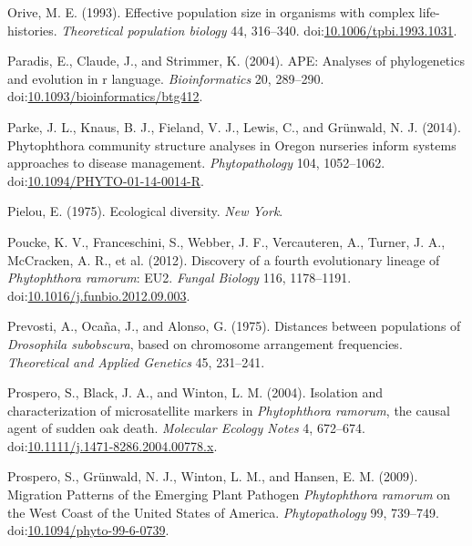 \documentclass[double,12pt]{beavtex}
\begin{document}
  \hypertarget{ref-orive1993effective}{}
  Orive, M. E. (1993). Effective population size in organisms with complex
  life-histories. \emph{Theoretical population biology} 44, 316--340.
  doi:\href{https://doi.org/10.1006/tpbi.1993.1031}{10.1006/tpbi.1993.1031}.
  
  \hypertarget{ref-paradis2004ape}{}
  Paradis, E., Claude, J., and Strimmer, K. (2004). APE: Analyses of
  phylogenetics and evolution in r language. \emph{Bioinformatics} 20,
  289--290.
  doi:\href{https://doi.org/10.1093/bioinformatics/btg412}{10.1093/bioinformatics/btg412}.
  
  \hypertarget{ref-parke2014phytophthora}{}
  Parke, J. L., Knaus, B. J., Fieland, V. J., Lewis, C., and Grünwald, N.
  J. (2014). Phytophthora community structure analyses in Oregon nurseries
  inform systems approaches to disease management. \emph{Phytopathology}
  104, 1052--1062.
  doi:\href{https://doi.org/10.1094/PHYTO-01-14-0014-R}{10.1094/PHYTO-01-14-0014-R}.
  
  \hypertarget{ref-pielou1975ecological}{}
  Pielou, E. (1975). Ecological diversity. \emph{New York}.
  
  \hypertarget{ref-vanpoucke2012discovery}{}
  Poucke, K. V., Franceschini, S., Webber, J. F., Vercauteren, A., Turner,
  J. A., McCracken, A. R., et al. (2012). Discovery of a fourth
  evolutionary lineage of \emph{Phytophthora ramorum}: EU2. \emph{Fungal
  Biology} 116, 1178--1191.
  doi:\href{https://doi.org/10.1016/j.funbio.2012.09.003}{10.1016/j.funbio.2012.09.003}.
  
  \hypertarget{ref-prevosti1975distances}{}
  Prevosti, A., Ocaña, J., and Alonso, G. (1975). Distances between
  populations of \emph{Drosophila subobscura}, based on chromosome
  arrangement frequencies. \emph{Theoretical and Applied Genetics} 45,
  231--241.
  
  \hypertarget{ref-prospero2004isolation}{}
  Prospero, S., Black, J. A., and Winton, L. M. (2004). Isolation and
  characterization of microsatellite markers in \emph{Phytophthora
  ramorum}, the causal agent of sudden oak death. \emph{Molecular Ecology
  Notes} 4, 672--674.
  doi:\href{https://doi.org/10.1111/j.1471-8286.2004.00778.x}{10.1111/j.1471-8286.2004.00778.x}.
  
  \hypertarget{ref-prospero2009migration}{}
  Prospero, S., Grünwald, N. J., Winton, L. M., and Hansen, E. M. (2009).
  Migration Patterns of the Emerging Plant Pathogen \emph{Phytophthora
  ramorum} on the West Coast of the United States of America.
  \emph{Phytopathology} 99, 739--749.
  doi:\href{https://doi.org/10.1094/phyto-99-6-0739}{10.1094/phyto-99-6-0739}.
  
\end{document}
